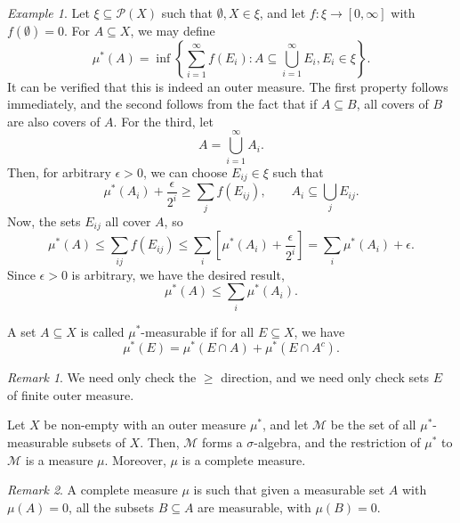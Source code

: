 \documentclass[11pt]{article}
\newcommand{\M}{\mathcal{M}}
\theoremstyle{definition}
\theoremstyle{remark}
\newtheorem*{remark}{Remark}
\newtheorem*{example}{Example}
\numberwithin{equation}{section}
\begin{document}
    \begin{example}
        Let $\xi \subseteq \mathcal{P}(X)$ such that $\emptyset, X \in \xi$, and let
        $f\colon \xi \to [0, \infty]$ with $f(\emptyset) = 0$. For $A \subseteq X$,
        we may define \[
            \mu^*(A) = \inf\left\{\sum_{i = 1}^\infty f(E_i) : A \subseteq \bigcup_{i
            = 1}^\infty E_i, E_i \in \xi\right\}.
        \] It can be verified that this is indeed an outer measure. The first
        property follows immediately, and the second follows from the fact that if
        $A\subseteq B$, all covers of $B$ are also covers of $A$. For the third, let
        \[
            A = \bigcup_{i = 1}^\infty A_i.
        \] Then, for arbitrary $\epsilon > 0$, we can choose $E_{ij} \in \xi$ such
        that \[
            \mu^*(A_i) + \frac{\epsilon}{2^i} \geq \sum_j f(E_{ij}), \qquad
            A_i \subseteq \bigcup_j E_{ij}.
        \] Now, the sets $E_{ij}$ all cover $A$, so \[
            \mu^*(A) \leq \sum_{ij} f(E_{ij}) \leq \sum_i \left[\mu^*(A_i) +
            \frac{\epsilon}{2^i}\right] = \sum_i \mu^*(A_i) + \epsilon.
        \] Since $\epsilon > 0$ is arbitrary, we have the desired result, \[
            \mu^*(A) \leq \sum_i \mu^*(A_i).
        \]
    \end{example}

    \begin{definition}
        A set $A \subseteq X$ is called $\mu^*$-measurable if for all $E \subseteq
        X$, we have \[
            \mu^*(E) = \mu^*(E \cap A) + \mu^*(E \cap A^c).
        \]
        \begin{remark}
            We need only check the $\geq$ direction, and we need only check sets $E$
            of finite outer measure.
        \end{remark}
    \end{definition}

    \begin{theorem}
        Let $X$ be non-empty with an outer measure $\mu^*$, and let $\M$ be the set
        of all $\mu^*$-measurable subsets of $X$. Then, $\M$ forms a
        $\sigma$-algebra, and the restriction of $\mu^*$ to $\M$ is a measure $\mu$.
        Moreover, $\mu$ is a complete measure.

        \begin{remark}
            A complete measure $\mu$ is such that given a measurable set $A$ with
            $\mu(A) = 0$, all the subsets $B \subseteq A$ are measurable, with
            $\mu(B) = 0$.
        \end{remark}
    \end{theorem}
\end{document}
